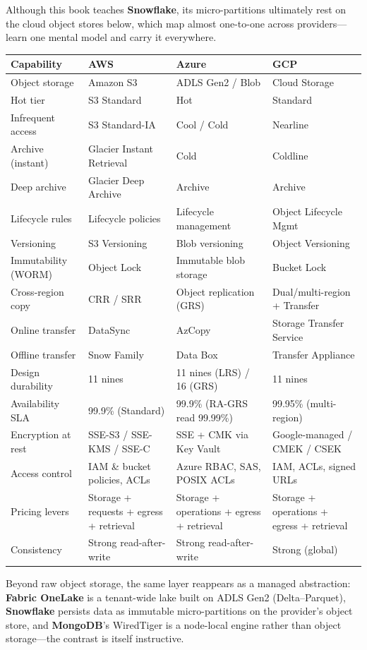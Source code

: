 \begin{crosscloud}
Although this book teaches \textbf{Snowflake}, its micro-partitions ultimately rest on the cloud object stores below, which map almost one-to-one across providers---learn one mental model and carry it everywhere.

\vspace{2mm}
{\footnotesize
\begin{tabular}{@{}p{2.8cm}p{3.0cm}p{3.0cm}p{3.0cm}@{}}
\toprule
\textbf{Capability} & \textbf{AWS} & \textbf{Azure} & \textbf{GCP} \\
\midrule
Object storage & Amazon S3 & ADLS Gen2 / Blob & Cloud Storage \\
Hot tier & S3 Standard & Hot & Standard \\
Infrequent access & S3 Standard-IA & Cool / Cold & Nearline \\
Archive (instant) & Glacier Instant Retrieval & Cold & Coldline \\
Deep archive & Glacier Deep Archive & Archive & Archive \\
Lifecycle rules & Lifecycle policies & Lifecycle management & Object Lifecycle Mgmt \\
Versioning & S3 Versioning & Blob versioning & Object Versioning \\
Immutability (WORM) & Object Lock & Immutable blob storage & Bucket Lock \\
Cross-region copy & CRR / SRR & Object replication (GRS) & Dual/multi-region + Transfer \\
Online transfer & DataSync & AzCopy & Storage Transfer Service \\
Offline transfer & Snow Family & Data Box & Transfer Appliance \\
\addlinespace
Design durability & 11 nines & 11 nines (LRS) / 16 (GRS) & 11 nines \\
Availability SLA & 99.9\% (Standard) & 99.9\% (RA-GRS read 99.99\%) & 99.95\% (multi-region) \\
Encryption at rest & SSE-S3 / SSE-KMS / SSE-C & SSE + CMK via Key Vault & Google-managed / CMEK / CSEK \\
Access control & IAM \& bucket policies, ACLs & Azure RBAC, SAS, POSIX ACLs & IAM, ACLs, signed URLs \\
Pricing levers & Storage + requests + egress + retrieval & Storage + operations + egress + retrieval & Storage + operations + egress + retrieval \\
Consistency & Strong read-after-write & Strong read-after-write & Strong (global) \\
\bottomrule
\end{tabular}}

\vspace{1mm}
Beyond raw object storage, the same layer reappears as a managed abstraction: \textbf{Fabric OneLake} is a tenant-wide lake built on ADLS Gen2 (Delta--Parquet), \textbf{Snowflake} persists data as immutable micro-partitions on the provider's object store, and \textbf{MongoDB}'s WiredTiger is a node-local engine rather than object storage---the contrast is itself instructive.
\end{crosscloud}

